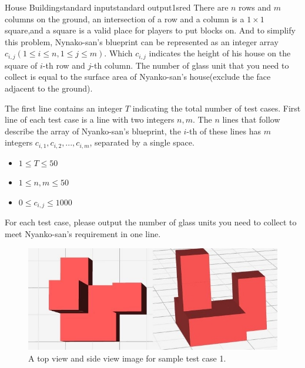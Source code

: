 \begin{problem}{House Building}{standard input}{standard output}{1s}{red}
There are $n$ rows and $m$ columns on the ground, an intersection of a row and a column is a $1 \times 1$ square,and a square is a valid place for players to put blocks on.
And to simplify this problem, Nynako-san's blueprint can be represented as an integer array $c_{i,j} (1\le i \le n, 1 \le j \le m)$.
Which $c_{i,j}$ indicates the height of his house on the square of $i$-th row and $j$-th column.
The number of glass unit that you need to collect is equal to the surface area of Nyanko-san's house(exclude the face adjacent to the ground).


\InputFile
The first line contains an integer $T$ indicating the total number of test cases.
First line of each test case is a line with two integers $n,m$.
The $n$ lines that follow describe the array of Nyanko-san's blueprint, the $i$-th of these lines has $m$ integers $c_{i,1}, c_{i,2}, ..., c_{i,m}$, separated by a single space.
\begin{itemize}
\item $1 \le T \le 50$
\item $1 \le n,m \le 50$
\item $0 \le c_{i,j} \le 1000$
\end{itemize}

\OutputFile
For each test case, please output the number of glass units you need to collect to meet Nyanko-san's requirement in one line.

\Example

\begin{example}
%
\end{example}
\begin{figure}[th!]\begin{center}
\includegraphics[scale=0.8]{sample.jpg} 
\caption{A top view and side view image for sample test case 1.}
\end{center} \end{figure}
\end{problem}